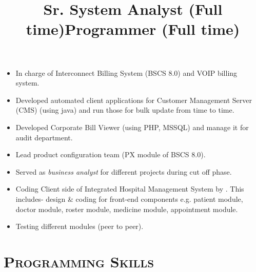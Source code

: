 \begin{resume}
%
\title{\bf Sr. System Analyst (Full time)}
\begin{position}
\vspace*{-.2cm}
\begin{itemize}
\item In charge of Interconnect Billing System (BSCS 8.0) and VOIP billing system.
\item Developed automated client applications for Customer Management Server (CMS) (using java) and run those for bulk update from time to time. 
\item Developed Corporate Bill Viewer (using PHP, MSSQL) and manage it for audit department.
\item Lead product configuration team (PX module of BSCS 8.0).
\item Served as \textit{business analyst} for different projects during cut off phase.
\end{itemize}
\end{position}
\vspace*{-.2cm}
\title{\bf Programmer (Full time)}
\begin{position}
\vspace*{-.2cm}
\begin{itemize}
\item Coding Client side of Integrated Hospital Management System by \CSharp. This includes- design \& coding for front-end components e.g. patient module, doctor module, roster module, medicine module, appointment module.
\item Testing different modules (peer to peer).
\end{itemize}
\end{position}


\section{\textsc{Programming Skills}}


\end{resume}
